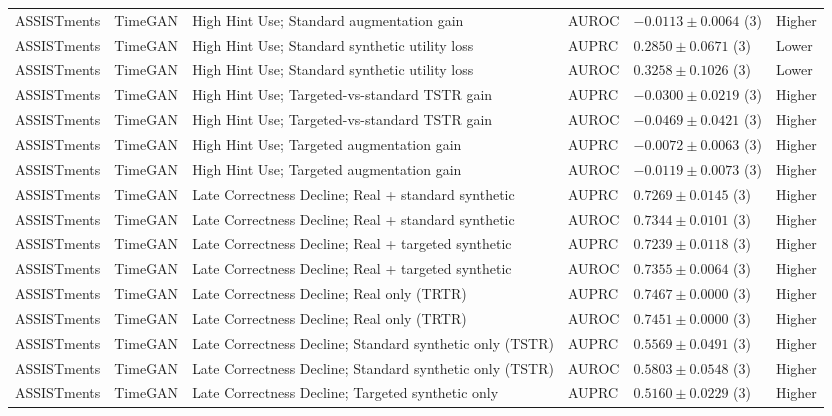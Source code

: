 \begin{longtable}{@{}p{2.25cm}p{2.05cm}p{4.7cm}p{5.0cm}p{2.6cm}p{1.25cm}@{}}
ASSISTments & TimeGAN & High Hint Use; Standard augmentation gain & AUROC & $-0.0113 \mathbin{\pm} 0.0064$ (3) & Higher \\
ASSISTments & TimeGAN & High Hint Use; Standard synthetic utility loss & AUPRC & $0.2850 \mathbin{\pm} 0.0671$ (3) & Lower \\
ASSISTments & TimeGAN & High Hint Use; Standard synthetic utility loss & AUROC & $0.3258 \mathbin{\pm} 0.1026$ (3) & Lower \\
ASSISTments & TimeGAN & High Hint Use; Targeted-vs-standard TSTR gain & AUPRC & $-0.0300 \mathbin{\pm} 0.0219$ (3) & Higher \\
ASSISTments & TimeGAN & High Hint Use; Targeted-vs-standard TSTR gain & AUROC & $-0.0469 \mathbin{\pm} 0.0421$ (3) & Higher \\
ASSISTments & TimeGAN & High Hint Use; Targeted augmentation gain & AUPRC & $-0.0072 \mathbin{\pm} 0.0063$ (3) & Higher \\
ASSISTments & TimeGAN & High Hint Use; Targeted augmentation gain & AUROC & $-0.0119 \mathbin{\pm} 0.0073$ (3) & Higher \\
ASSISTments & TimeGAN & Late Correctness Decline; Real + standard synthetic & AUPRC & $0.7269 \mathbin{\pm} 0.0145$ (3) & Higher \\
ASSISTments & TimeGAN & Late Correctness Decline; Real + standard synthetic & AUROC & $0.7344 \mathbin{\pm} 0.0101$ (3) & Higher \\
ASSISTments & TimeGAN & Late Correctness Decline; Real + targeted synthetic & AUPRC & $0.7239 \mathbin{\pm} 0.0118$ (3) & Higher \\
ASSISTments & TimeGAN & Late Correctness Decline; Real + targeted synthetic & AUROC & $0.7355 \mathbin{\pm} 0.0064$ (3) & Higher \\
ASSISTments & TimeGAN & Late Correctness Decline; Real only (TRTR) & AUPRC & $0.7467 \mathbin{\pm} 0.0000$ (3) & Higher \\
ASSISTments & TimeGAN & Late Correctness Decline; Real only (TRTR) & AUROC & $0.7451 \mathbin{\pm} 0.0000$ (3) & Higher \\
ASSISTments & TimeGAN & Late Correctness Decline; Standard synthetic only (TSTR) & AUPRC & $0.5569 \mathbin{\pm} 0.0491$ (3) & Higher \\
ASSISTments & TimeGAN & Late Correctness Decline; Standard synthetic only (TSTR) & AUROC & $0.5803 \mathbin{\pm} 0.0548$ (3) & Higher \\
ASSISTments & TimeGAN & Late Correctness Decline; Targeted synthetic only & AUPRC & $0.5160 \mathbin{\pm} 0.0229$ (3) & Higher \\

\end{longtable}
